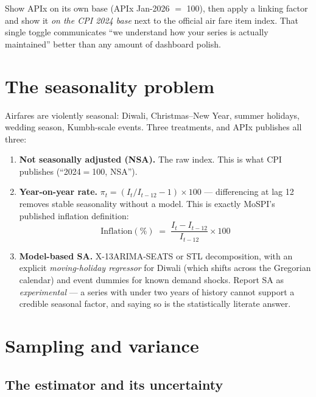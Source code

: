 \begin{warnbox}
 Show APIx on its own base (APIx Jan-2026 $=$ 100), then apply
a linking factor and show it \emph{on the CPI 2024 base} next to the official air fare item
index. That single toggle communicates ``we understand how your series is actually
maintained'' better than any amount of dashboard polish.
\end{warnbox}

\section{The seasonality problem}

Airfares are violently seasonal: Diwali, Christmas--New Year, summer holidays, wedding
season, Kumbh-scale events. Three treatments, and APIx publishes all three:

\begin{enumerate}
\item \textbf{Not seasonally adjusted (NSA).} The raw index. This is what CPI publishes
(``2024$=$100, NSA'').
\item \textbf{Year-on-year rate.} $\pi_t = (I_t/I_{t-12} - 1)\times 100$ --- differencing at
lag 12 removes stable seasonality without a model. This is exactly MoSPI's published
inflation definition:
\begin{equation}
\text{Inflation}(\%) \;=\; \frac{I_t - I_{t-12}}{I_{t-12}}\times 100
\end{equation}
\item \textbf{Model-based SA.} X-13ARIMA-SEATS or STL decomposition, with an explicit
\emph{moving-holiday regressor} for Diwali (which shifts across the Gregorian calendar) and
event dummies for known demand shocks. Report SA as \emph{experimental} --- a series with
under two years of history cannot support a credible seasonal factor, and saying so is the
statistically literate answer.
\end{enumerate}

\section{Sampling and variance}

\subsection{The estimator and its uncertainty}

